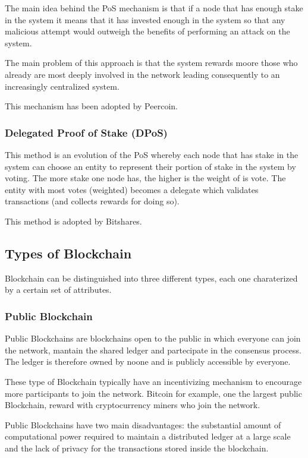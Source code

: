 The main idea behind the PoS mechanism is that if a node that has enough stake in
the system it means that it has invested enough in the system so that any
malicious attempt would outweigh the benefits of performing an attack on the
system.

The main problem of this approach is that the system rewards moore those who
already are most deeply involved in the network leading consequently to an
increasingly centralized system.

This mechanism has been adopted by Peercoin.

\subsubsection{Delegated Proof of Stake (DPoS)}
This method is an evolution of the PoS whereby each node that has stake in the
system can choose an entity to represent their portion of stake in the system
by voting. The more stake one node has, the higher is the weight of is vote.
The entity with most votes (weighted) becomes a delegate which validates transactions
(and collects rewards for doing so).

This method is adopted by Bitshares.

\subsection{Types of Blockchain}
Blockchain can be distinguished into three different types, each one charaterized
by a certain set of attributes.
\subsubsection*{Public Blockchain}
Public Blockchains are blockchains open to the public in which everyone can join
the network, mantain the shared ledger and partecipate in the consensus process.
The ledger is therefore owned by noone and is publicly accessible by everyone.

These type of Blockchain typically have an incentivizing mechanism to encourage
more participants to join the network. Bitcoin for example, one the largest public
Blockchain, reward with cryptocurrency miners who join the network.

Public Blockchains have two main disadvantages: the substantial amount of
computational power required to maintain a distributed ledger at a large scale
and the lack of privacy for the transactions stored inside the blockchain.

